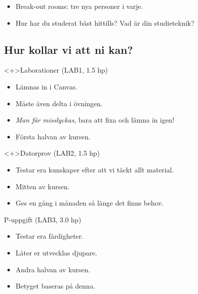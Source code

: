 \begin{frame}
  \begin{exercise}
    \begin{itemize}
      \item Break-out rooms: tre nya personer i varje.
      \item Hur har du studerat bäst hittills? Vad är din studieteknik?
    \end{itemize}
  \end{exercise}
\end{frame}

\subsection{Hur kollar vi att ni kan?}

\begin{frame}
  \begin{block}<+>{Laborationer (LAB1, 1.5 hp)}
    \begin{itemize}
      \item Lämnas in i Canvas.
      \item Måste även delta i övningen.
      \item \emph{Man får misslyckas}, bara att fixa och lämna in igen!
      \item Första halvan av kursen.
    \end{itemize}
  \end{block}

  \begin{block}<+>{Datorprov (LAB2, 1.5 hp)}
    \begin{itemize}
      \item Testar era kunskaper efter att vi täckt allt material.
      \item Mitten av kursen.
      \item Ges en gång i månaden så länge det finns behov.
    \end{itemize}
  \end{block}
\end{frame}

\begin{frame}
  \begin{block}{P-uppgift (LAB3, 3.0 hp)}
    \begin{itemize}
      \item Testar era färdigheter.
      \item Låter er utvecklas djupare.
      \item Andra halvan av kursen.
      \item Betyget baseras på denna.
    \end{itemize}
  \end{block}
\end{frame}

